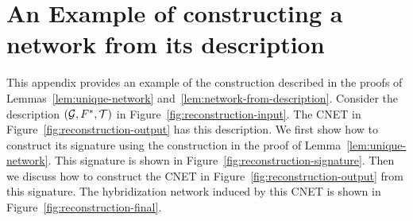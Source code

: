 \section{An Example of constructing a network from its description}

\label{sec:example}

This appendix provides an example of the construction described in the proofs of
Lemmas~\ref{lem:unique-network} and~\ref{lem:network-from-description}.
Consider the description $(\mathcal{G}, F^*, \mathcal{T})$ in
Figure~\ref{fig:reconstruction-input}.
The CNET in Figure~\ref{fig:reconstruction-output} has this description.
We first show how to construct its signature using the construction in the
proof of Lemma~\ref{lem:unique-network}.
This signature is shown in Figure~\ref{fig:reconstruction-signature}.
Then we discuss how to construct the CNET in
Figure~\ref{fig:reconstruction-output} from this signature.
{The hybridization network induced by this CNET} is shown in Figure~\ref{fig:reconstruction-final}.

